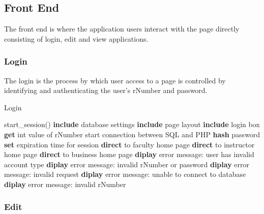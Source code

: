 	
	\subsection{Front End}
	The front end is where the application users interact with the page directly consisting of login, edit and view applications.
		
		\subsubsection{Login}
		The login is the process by which user access to a page is controlled by identifying and authenticating the user's rNumber and password. 
		
		\begin{algorithm}[H]
			\caption{Login}
			\begin{algorithmic}[1]
			\State start\_session()
			\State \textbf{include} database settings
			\State \textbf{include} page layout
			\State \textbf{include} login box
				\State \textbf{get} int value of rNumber
				\State start connection between SQL and PHP
					\State \textbf{hash} password
					 	\State \textbf{set} expiration time for session
					 		\State \textbf{direct} to faculty home page 
					 		\State \textbf{direct} to instructor home page 
					 		\State \textbf{direct} to business home page
					 		\Else
					 		\State \textbf{diplay} error message: user has invalid account type
					 		\EndIf 	
					 	\Else
					 	\State \textbf{diplay} error message: invalid rNumber or password
					 	\EndIf 
					\Else
				 	\State \textbf{diplay} error message: invalid request
				 	\EndIf 
				\Else
			 	\State \textbf{diplay} error message: unable to connect to database	
				\EndIf
			\Else
			\State \textbf{diplay} error message: invalid rNumber	
			\EndIf			
		\end{algorithmic} 
		\end{algorithm}
		
		\subsubsection{Edit}
		
